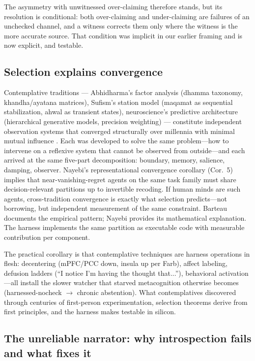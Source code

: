 \documentclass[11pt]{article}
\begin{document}
The asymmetry with unwitnessed over-claiming \citep{panickssery2024}
therefore stands, but its resolution is conditional: both over-claiming and
under-claiming are failures of an unchecked channel, and a witness corrects
them only where the witness is the more accurate source. That condition was
implicit in our earlier framing and is now explicit, and testable.

\subsection{Selection explains convergence}

Contemplative traditions --- Abhidharma's factor analysis (dhamma
taxonomy, khandha/ayatana matrices), Sufism's station model (maqamat
as sequential stabilization, ahwal as transient states), neuroscience's
predictive architecture (hierarchical generative models, precision
weighting) --- constitute independent observation systems that converged
structurally over millennia with minimal mutual influence \citep{barteau2025}.
Each was developed to solve the same problem---how to intervene on a
reflexive system that cannot be observed from outside---and each arrived
at the same five-part decomposition: boundary, memory, salience, damping,
observer. Nayebi's representational convergence corollary (Cor.~5)
implies that near-vanishing-regret agents on the same task family must
share decision-relevant partitions up to invertible recoding. If human
minds are such agents, cross-tradition convergence is exactly what
selection predicts---not borrowing, but independent measurement of the
same constraint. Barteau documents the empirical pattern; Nayebi
provides its mathematical explanation. The harness implements the same
partition as executable code with measurable contribution per component.

The practical corollary is that contemplative techniques are harness
operations in flesh: decentering (mPFC/PCC down, insula up per Farb),
affect labeling, defusion ladders (``I notice I'm having the thought
that...''), behavioral activation---all install the slower watcher that
starved metacognition otherwise becomes (harnessed-nocheck $\to$\allowbreak{} chronic
abstention). What contemplatives discovered through centuries of
first-person experimentation, selection theorems derive from first
principles, and the harness makes testable in silicon.

\subsection{The unreliable narrator: why introspection fails and what fixes it}
\end{document}
